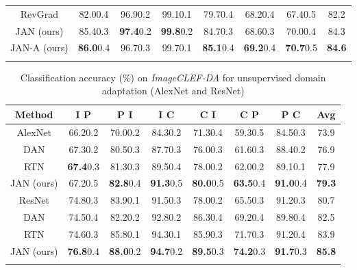 \documentclass{article}
\begin{document}
\begin{table*}[!htbp]
\begin{small}
\begin{tabular}{cccccccc}
    RevGrad \cite{cite:ICML15RevGrad} & 82.00.4 & 96.90.2 & 99.10.1 & 79.70.4 & 68.20.4 & 67.40.5 & 82.2 \\
    JAN (ours) & 85.40.3 & \textbf{97.4}0.2 & \textbf{99.8}0.2 & 84.70.3 & 68.60.3 & 70.00.4 & 84.3 \\
    JAN-A (ours) & \textbf{86.0}0.4 & 96.70.3 & 99.70.1 & \textbf{85.1}0.4 & \textbf{69.2}0.4 & \textbf{70.7}0.5 & \textbf{84.6} \\
    \Xhline{1pt}
  \end{tabular}
  \end{small}
  \vspace{-5pt}
\end{table*}

\begin{table*}[!htbp]
  \addtolength{\tabcolsep}{2.8pt}
  \centering
  \caption{Classification accuracy (\%) on \emph{ImageCLEF-DA} for unsupervised domain adaptation (AlexNet and ResNet)}
  \label{table:imageclef-da}
  \begin{small}
  \begin{tabular}{cccccccc}
    \Xhline{1pt}
    Method & I  P & P  I & I  C & C  I & C  P & P  C & Avg \\
    \hline
    AlexNet \cite{cite:NIPS12CNN} & 66.20.2 & 70.00.2 & 84.30.2 & 71.30.4 & 59.30.5 & 84.50.3 & 73.9 \\
    DAN \cite{cite:ICML15DAN} & 67.30.2 & 80.50.3 & 87.70.3 & 76.00.3 & 61.60.3 & 88.40.2 & 76.9 \\
    RTN \cite{cite:NIPS16RTN} & \textbf{67.4}0.3 & 81.30.3 & 89.50.4 & 78.00.2 & 62.00.2 & 89.10.1 & 77.9 \\
    JAN (ours) & 67.20.5 & \textbf{82.8}0.4 & \textbf{91.3}0.5 & \textbf{80.0}0.5 & \textbf{63.5}0.4 & \textbf{91.0}0.4 & \textbf{79.3} \\
    \hline
    ResNet \cite{cite:CVPR16DRL} & 74.80.3 & 83.90.1 & 91.50.3 & 78.00.2 & 65.50.3 & 91.20.3 & 80.7 \\
    DAN \cite{cite:ICML15DAN} & 74.50.4 & 82.20.2 & 92.80.2 & 86.30.4 & 69.20.4 & 89.80.4 & 82.5 \\
    RTN \cite{cite:NIPS16RTN} & 74.60.3 & 85.80.1 & 94.30.1 & 85.90.3 & 71.70.3 & 91.20.4 & 83.9 \\
    JAN (ours) & \textbf{76.8}0.4 & \textbf{88.0}0.2 & \textbf{94.7}0.2 & \textbf{89.5}0.3 & \textbf{74.2}0.3 & \textbf{91.7}0.3 & \textbf{85.8} \\
    \Xhline{1pt}
  \end{tabular}
  \end{small}
  \vspace{-5pt}
\end{table*}
\end{document}
